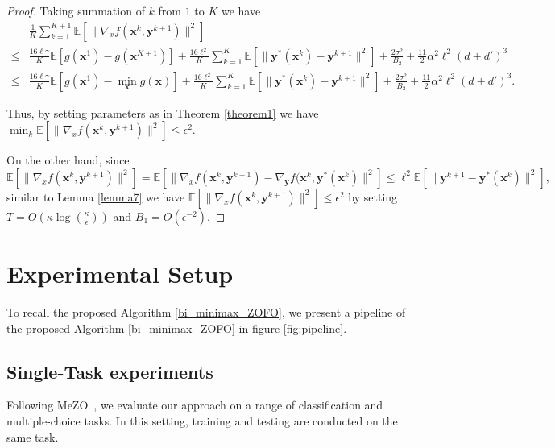 \begin{proof}
    Taking summation of $k$ from $1$ to $K$ we have
    \begin{align*}
        & \frac{1}{K}\sum_{k=1}^{K+1}\mathbb{E}[\|\nabla_xf({ \mathbf{x}}^k,{ \mathbf{y}}^{k+1})\|^2] \\
        \leq & \frac{16\ell\gamma}{K}\mathbb{E}[g({ \mathbf{x}}^{1})-g({ \mathbf{x}}^{K+1})]+\frac{16\ell^2}{K}\sum_{k=1}^K\mathbb{E}[\|{ \mathbf{y}}^*({ \mathbf{x}}^k)-{ \mathbf{y}}^{k+1}\|^2]+\frac{2\sigma^2}{B_2}+\frac{11}{2}\alpha^2\ell^2(d+d')^3 \\
        \leq & \frac{16\ell\gamma}{K}\mathbb{E}[g({ \mathbf{x}}^{1})-\min_{ \mathbf{x}} g({ \mathbf{x}})]+\frac{16\ell^2}{K}\sum_{k=1}^K\mathbb{E}[\|{ \mathbf{y}}^*({ \mathbf{x}}^k)-{ \mathbf{y}}^{k+1}\|^2]+\frac{2\sigma^2}{B_2}+\frac{11}{2}\alpha^2\ell^2(d+d')^3.
    \end{align*}

    Thus, by setting parameters as in Theorem \ref{theorem1} we have $\min_k\mathbb{E}[\|\nabla_xf({ \mathbf{x}}^k,{ \mathbf{y}}^{k+1})\|^2]\leq \epsilon^2.$

    On the other hand, since
    $$\mathbb{E}[\|\nabla_xf({ \mathbf{x}}^k,{ \mathbf{y}}^{k+1})\|^2]=\mathbb{E}[\|\nabla_xf({ \mathbf{x}}^k,{ \mathbf{y}}^{k+1})-\nabla_{ \mathbf{y}} f({ \mathbf{x}}^k,{ \mathbf{y}}^*({ \mathbf{x}}^k)\|^2]\leq\ell^2\mathbb{E}[\|{ \mathbf{y}}^{k+1}-{ \mathbf{y}}^*({ \mathbf{x}}^k)\|^2],$$
    similar to Lemma \ref{lemma7} we have $\mathbb{E}[\|\nabla_xf({ \mathbf{x}}^k,{ \mathbf{y}}^{k+1})\|^2]\leq \epsilon^2$ by setting $T=O(\kappa\log(\frac{\kappa}{\epsilon}))$ and $B_1=O(\epsilon^{-2}).$
\end{proof}


\section{Experimental Setup}\label{app:experiment}
{To recall the proposed Algorithm \ref{bi_minimax_ZOFO}, we present a pipeline of the proposed Algorithm \ref{bi_minimax_ZOFO} in figure \ref{fig:pipeline}.}


\subsection{Single-Task experiments}\label{app:single-task-exp}
Following MeZO~\citep{MalladiGNDL0A23Mezo}, we evaluate our approach on a range of classification and multiple-choice tasks. In this setting, training and testing are conducted on the same task.

